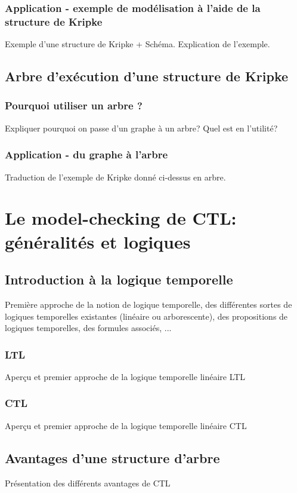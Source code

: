 \documentclass[runningheads,a4paper,10pt]{llncs}
\begin{document}
\subsubsection{Application - exemple de modélisation à l'aide de la structure de Kripke}
Exemple d'une structure de Kripke + Schéma. Explication de l'exemple. 

\subsection{Arbre d'exécution d'une structure de Kripke}

\subsubsection{Pourquoi utiliser un arbre ?}
Expliquer pourquoi on passe d'un graphe à un arbre? Quel est en l'utilité? 

\subsubsection{Application - du graphe à l'arbre}
Traduction de l'exemple de Kripke donné ci-dessus en arbre. 

\section{Le model-checking de CTL: généralités et logiques}

\subsection{Introduction à la logique temporelle}
Première approche de la notion de logique temporelle, des différentes sortes de logiques temporelles existantes (linéaire ou arborescente), des propositions de logiques temporelles, des formules associés, ... 

\subsubsection{LTL}
Aperçu et premier approche de la logique temporelle linéaire LTL 

\subsubsection{CTL}
Aperçu et premier approche de la logique temporelle linéaire CTL 

\subsection{Avantages d'une structure d'arbre}
Présentation des différents avantages de CTL
\end{document}
